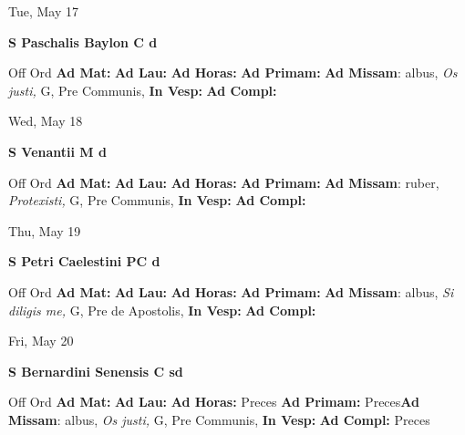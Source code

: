 \documentclass[10pt]{book}
\begin{document}
\begin{center}
\begin{minipage}{3.5in}
\vspace{2em}
\begin{center}Tue, May 17
\end{center}
\textbf{ \large S Paschalis Baylon C
\textnormal{\normalsize d}}

\begin{justify}Off Ord
\textbf{Ad Mat: }
\textbf{Ad Lau: }
\textbf{Ad Horas: }
\textbf{Ad Primam: }\textbf{Ad Missam}: albus, \textit{Os justi,} G, Pre Communis, 
\textbf{In Vesp: }
\textbf{Ad Compl: }
\end{justify}
\end{minipage}
\end{center}

\begin{center}
\begin{minipage}{3.5in}
\vspace{2em}
\begin{center}Wed, May 18
\end{center}
\textbf{ \large S Venantii M
\textnormal{\normalsize d}}

\begin{justify}Off Ord
\textbf{Ad Mat: }
\textbf{Ad Lau: }
\textbf{Ad Horas: }
\textbf{Ad Primam: }\textbf{Ad Missam}: ruber, \textit{Protexisti,} G, Pre Communis, 
\textbf{In Vesp: }
\textbf{Ad Compl: }
\end{justify}
\end{minipage}
\end{center}

\begin{center}
\begin{minipage}{3.5in}
\vspace{2em}
\begin{center}Thu, May 19
\end{center}
\textbf{ \large S Petri Caelestini PC
\textnormal{\normalsize d}}

\begin{justify}Off Ord
\textbf{Ad Mat: }
\textbf{Ad Lau: }
\textbf{Ad Horas: }
\textbf{Ad Primam: }\textbf{Ad Missam}: albus, \textit{Si diligis me,} G, Pre de Apostolis, 
\textbf{In Vesp: }
\textbf{Ad Compl: }
\end{justify}
\end{minipage}
\end{center}

\begin{center}
\begin{minipage}{3.5in}
\vspace{2em}
\begin{center}Fri, May 20
\end{center}
\textbf{ \large S Bernardini Senensis C
\textnormal{\normalsize sd}}

\begin{justify}Off Ord
\textbf{Ad Mat: }
\textbf{Ad Lau: }
\textbf{Ad Horas: }Preces
\textbf{Ad Primam: }Preces\textbf{Ad Missam}: albus, \textit{Os justi,} G, Pre Communis, 
\textbf{In Vesp: }
\textbf{Ad Compl: }Preces
\end{justify}
\end{minipage}
\end{center}
\end{document}
